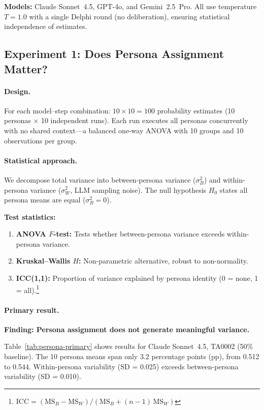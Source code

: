 \textbf{Models:} Claude Sonnet~4.5, GPT-4o, and Gemini~2.5~Pro. All use temperature $T=1.0$ with a single Delphi round (no deliberation), ensuring statistical independence of estimates.


\subsection{Experiment 1: Does Persona Assignment Matter?}
\label{sec:persona-variance}

\paragraph{Design.}
For each model--step combination: $10 \times 10 = 100$ probability estimates (10 personas $\times$ 10 independent runs). Each run executes all personas concurrently with no shared context---a balanced one-way ANOVA with 10 groups and 10 observations per group.

\paragraph{Statistical approach.}
We decompose total variance into between-persona variance ($\sigma^2_B$) and within-persona variance ($\sigma^2_W$, LLM sampling noise). The null hypothesis $H_0$ states all persona means are equal ($\sigma^2_B = 0$).

\textbf{Test statistics:}
\begin{enumerate}
  \item \textbf{ANOVA $F$-test:} Tests whether between-persona variance exceeds within-persona variance.
  \item \textbf{Kruskal--Wallis $H$:} Non-parametric alternative, robust to non-normality.
  \item \textbf{ICC(1,1):} Proportion of variance explained by persona identity (0 = none, 1 = all).\footnote{$\mathrm{ICC} = (\mathrm{MS}_B - \mathrm{MS}_W) / (\mathrm{MS}_B + (n{-}1)\,\mathrm{MS}_W)$}
\end{enumerate}

\paragraph{Primary result.}
\textbf{Finding: Persona assignment does not generate meaningful variance.}

Table~\ref{tab:persona-primary} shows results for Claude Sonnet~4.5, TA0002 (50\% baseline). The 10 persona means span only 3.2 percentage points (pp), from 0.512 to 0.544. Within-persona variability (SD = 0.025) exceeds between-persona variability (SD = 0.010).

